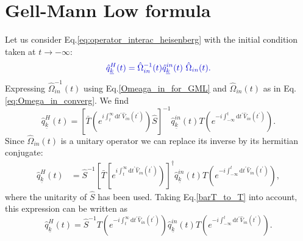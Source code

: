 \documentclass[
11pt, %
english, %
singlespacing, %
headsepline, %
]{MastersDoctoralThesis} %
\begin{document}
\section{Gell-Mann Low formula}
Let us consider Eq.\enskip\eqref{eq:operator_interac_heisenberg} with the initial condition taken at $ t \rightarrow - \infty $:
\begin{equation}\textcolor[RGB]{0,0,204}{
\hat{q}^{H}_{\underline{k}}(t)=\hat{\Omega}_{in}^{-1}(t)\hat{q}^{in}_{\underline{k}}(t)\ \hat{\Omega}_{in}(t).
}
\end{equation}
Expressing $ \hat{\Omega}^{-1}_{in}(t) $ using Eq.\enskip\eqref{Omeaga_in_for_GML} and $ \hat{\Omega}_{in}(t) $ as in Eq.\enskip\eqref{eq:Omega_in_converg}. We find 
\begin{equation}
\hat{q}^{H}_{\underline{k}}(t)
=\left[ 
\bar{T}
\left( 
 e^{i\int_{t}^{\infty}\mathrm{d}t^{\prime} \hat{V}_{in}(t^{\prime})}
\right) 
\hat{S}
\right]^{-1}
\hat{q}^{in}_{\underline{k}}(t)
T
\left( 
 e^{-i\int_{-\infty}^{t}\mathrm{d}t^{\prime} \hat{V}_{in}(t^{\prime})}
\right) 
.
\end{equation}
Since $ \hat{\Omega}_{in}(t) $ is a unitary operator we can replace its inverse by its hermitian conjugate:
\begin{equation}
\begin{split}
\hat{q}^{H}_{\underline{k}}(t)
&=
\hat{S}^{-1}\left[ 
\bar{T}
\left[ 
 e^{i\int_{t}^{\infty}\mathrm{d}t^{\prime} \hat{V}_{in}(t^{\prime})}
\right) 
\right]^{\dagger}
\hat{q}^{in}_{\underline{k}}(t)
T
\left( 
 e^{-i\int_{-\infty}^{t}\mathrm{d}t^{\prime} \hat{V}_{in}(t^{\prime})}
\right) 
,
\end{split}
\end{equation}
where the unitarity of $ \hat{S} $ has been used.
Taking Eq.\enskip\eqref{barT_to_T} into account, this expression can be written as
\begin{equation}\label{1st_expression_for_Omega_H}
\hat{q}^{H}_{\underline{k}}(t)
=
\hat{S}^{-1} 
T
\left( 
 e^{-i\int_{t}^{\infty}\mathrm{d}t^{\prime} \hat{V}_{in}(t^{\prime})}
\right)
\hat{q}^{in}_{\underline{k}}(t)
T
\left( 
 e^{-i\int_{-\infty}^{t}\mathrm{d}t^{\prime} \hat{V}_{in}(t^{\prime})}
\right) .
\end{equation}
\end{document}

